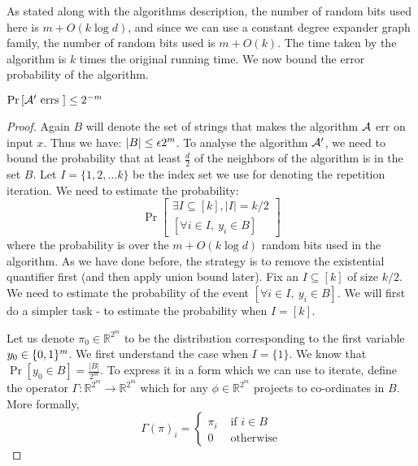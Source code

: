 As stated along with the algorithms description, the number of random bits used here is $m+O(k \log d)$, and since we can use a constant degree expander graph family, the number of random bits used is $m+O(k)$. The time taken by the algorithm is $k$ times the original running time. We now bound the error probability of the algorithm.

\begin{lemma}
\label{lem:expwalk-amplification-bound}
$\Pr\left[{\cal A}' \textrm{ errs }\right] \le 2^{-m}$
\end{lemma}
\begin{proof}
Again $B$ will denote the set of strings that makes the algorithm ${\cal A}$ err on input $x$. Thus we have: $\left|B \right| \le \epsilon 2^m$. To analyse the algorithm ${\cal A}'$, we need to bound the probability that at least $\frac{d}{2}$ of the neighbors of the algorithm is in the set $B$. Let $I = \{1,2,\ldots k\}$ be the index set we use for denoting the repetition iteration. We need to estimate the probability:
$$\Pr\left[ \begin{array}{c}
\exists I \subseteq [k], |I|=k/2 \\
\left[ \forall i \in I,~y_i \in B \right]
\end{array}
\right]
$$
where the probability is over the $m+O(k\log d)$ random bits used in the algorithm. As we have done before, the strategy is to remove the existential quantifier first (and then apply union bound later). Fix an $I \subseteq [k]$ of size $k/2$. We need to estimate the probability of the event $\left[ \forall i \in I,~y_i \in B \right]$. We will first do a simpler task - to estimate the probability when $I=[k]$.

Let us denote $\pi_0 \in \mathbb{R}^{2^m}$ to be the distribution corresponding to the first variable $y_0 \in \{0,1\}^m$. We first understand the case when $I = \{1\}$. We know that $\Pr[y_0 \in B] = \frac{|B|}{2^m}$. To express it in a form which we can use to iterate, define the operator $\Gamma : \mathbb{R}^{2^m} \to \mathbb{R}^{2^m}$ which for any $\phi \in \mathbb{R}^{2^m}$ projects to co-ordinates in $B$. More formally,
\[
\Gamma(\pi)_i = \left\{
\begin{array}{ll}
\pi_i & \textrm{ if $i \in B$} \\
0 & \textrm{ otherwise}
\end{array}
\right.
\]


\end{proof}